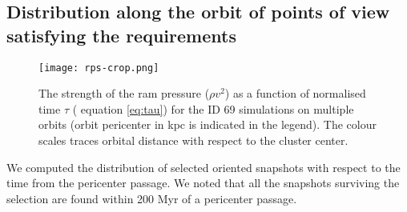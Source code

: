 \subsection{Distribution along the orbit of points of view satisfying the requirements}
\begin{figure}
\centering
\texttt{[image: rps-crop.png]}
\caption{The strength of the ram pressure ($\rho v^2$) as a function of normalised time $\tau$ (\cf{} equation \eqref{eq:tau}) for the ID 69 simulations on multiple orbits (orbit pericenter in kpc is indicated in the legend). The colour scales traces orbital distance with respect to the cluster center.}
\label{fig:r_rps}
\end{figure}
We computed the distribution of selected oriented snapshots with respect to the time from the pericenter passage.
We noted that all the snapshots surviving the selection are found within 200 Myr of a pericenter passage.


